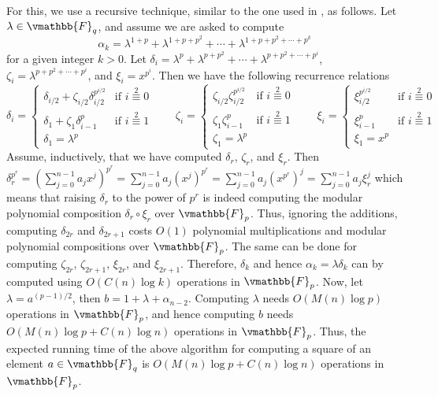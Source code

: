 For this, we use a recursive technique, similar to the one used in  , as 
follows. Let $\lambda \in \vmathbb{F}_q$, and assume we are asked to compute 
$$
\alpha_k = \lambda^{1 + p} + \lambda^{1 + p + p^2} + \cdots + \lambda^{1 + p + p^2 + \cdots + p^k}
$$
for a given integer $k > 0$. Let $\delta_i = \lambda^{p} + \lambda^{p + p^2} + \cdots + \lambda^{p + 
p^2 + \cdots + p^i}$, $\zeta_i = \lambda^{p + p^2 + \cdots + p^i}$, and $\xi_i = x^{p^i}$. Then we 
have the following recurrence relations
$$
\delta_i = 
\begin{cases}
\delta_{i / 2} + \zeta_{i / 2}\delta_{i / 2}^{p^{i / 2}} & \text{if } i \overset{2}{\equiv} 0 \\
\delta_1 + \zeta_1\delta_{i - 1}^p & \text{if } i \overset{2}{\equiv} 1 \\
\delta_1 = \lambda^p
\end{cases}
\qquad
\zeta_i = 
\begin{cases}
\zeta_{i / 2}\zeta_{i / 2}^{p^{i / 2}} & \text{if } i \overset{2}{\equiv} 0 \\
\zeta_1\zeta_{i - 1}^p & \text{if } i \overset{2}{\equiv} 1 \\
\zeta_1 = \lambda^p
\end{cases}
\qquad
\xi_i =
\begin{cases}
\xi_{i / 2}^{p^{i / 2}} & \text{if } i \overset{2}{\equiv} 0 \\
\xi_{i - 1}^p & \text{if } i \overset{2}{\equiv} 1 \\
\xi_1 = x^p
\end{cases}
$$
Assume, inductively, that we have computed $\delta_r$, $\zeta_r$, and $\xi_r$. Then $\delta_r^{p^r} 
= \left( \sum_{j = 0}^{n - 1} a_jx^j \right)^{p^r} = \sum_{j = 0}^{n - 1} a_j(x^j)^{p^r} = \sum_{j = 
0}^{n - 1} a_j(x^{p^r})^j = \sum_{j = 0}^{n - 1} a_j\xi_r^j$ which means that raising $\delta_r$ to 
the power of $p^r$ is indeed computing the modular polynomial composition $\delta_r\circ\xi_r$ over 
$\vmathbb{F}_p$. Thus, ignoring the additions, computing $\delta_{2r}$ and $\delta_{2r + 1}$ costs 
$O(1)$ polynomial multiplications and modular polynomial compositions over $\vmathbb{F}_p$. The same 
can be done for computing $\zeta_{2r}$, $\zeta_{2r + 1}$, $\xi_{2r}$, and $\xi_{2r + 1}$. Therefore, 
$\delta_k$ and hence $\alpha_k = \lambda\delta_k$ can by computed using $O(C(n)\log k)$ operations 
in $\vmathbb{F}_p$. Now, let $\lambda = a^{(p - 1) / 2}$, then $b = 1 + \lambda + \alpha_{n - 2}$. 
Computing $\lambda$ needs $O(M(n)\log p)$ operations in $\vmathbb{F}_p$, and hence computing $b$ 
needs $O(M(n)\log p + C(n)\log n)$ operations in $\vmathbb{F}_p$. Thus, the expected running time of 
the above algorithm for computing a square of an element $a \in \vmathbb{F}_q$ is $O(M(n)\log p + 
C(n)\log n)$ operations in $\vmathbb{F}_p$. 

